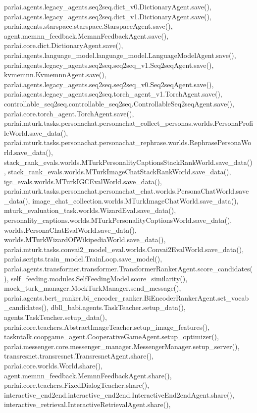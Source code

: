 parlai.\+agents.\+legacy\+\_\+agents.\+seq2seq.\+dict\+\_\+v0.\+Dictionary\+Agent.\+save(), parlai.\+agents.\+legacy\+\_\+agents.\+seq2seq.\+dict\+\_\+v1.\+Dictionary\+Agent.\+save(), parlai.\+agents.\+starspace.\+starspace.\+Starspace\+Agent.\+save(), agent.\+memnn\+\_\+feedback.\+Memnn\+Feedback\+Agent.\+save(), parlai.\+core.\+dict.\+Dictionary\+Agent.\+save(), parlai.\+agents.\+language\+\_\+model.\+language\+\_\+model.\+Language\+Model\+Agent.\+save(), parlai.\+agents.\+legacy\+\_\+agents.\+seq2seq.\+seq2seq\+\_\+v1.\+Seq2seq\+Agent.\+save(), kvmemnn.\+Kvmemnn\+Agent.\+save(), parlai.\+agents.\+legacy\+\_\+agents.\+seq2seq.\+seq2seq\+\_\+v0.\+Seq2seq\+Agent.\+save(), parlai.\+agents.\+legacy\+\_\+agents.\+seq2seq.\+torch\+\_\+agent\+\_\+v1.\+Torch\+Agent.\+save(), controllable\+\_\+seq2seq.\+controllable\+\_\+seq2seq.\+Controllable\+Seq2seq\+Agent.\+save(), parlai.\+core.\+torch\+\_\+agent.\+Torch\+Agent.\+save(), parlai.\+mturk.\+tasks.\+personachat.\+personachat\+\_\+collect\+\_\+personas.\+worlds.\+Persona\+Profile\+World.\+save\+\_\+data(), parlai.\+mturk.\+tasks.\+personachat.\+personachat\+\_\+rephrase.\+worlds.\+Rephrase\+Persona\+World.\+save\+\_\+data(), stack\+\_\+rank\+\_\+evals.\+worlds.\+M\+Turk\+Personality\+Captions\+Stack\+Rank\+World.\+save\+\_\+data(), stack\+\_\+rank\+\_\+evals.\+worlds.\+M\+Turk\+Image\+Chat\+Stack\+Rank\+World.\+save\+\_\+data(), igc\+\_\+evals.\+worlds.\+M\+Turk\+I\+G\+C\+Eval\+World.\+save\+\_\+data(), parlai.\+mturk.\+tasks.\+personachat.\+personachat\+\_\+chat.\+worlds.\+Persona\+Chat\+World.\+save\+\_\+data(), image\+\_\+chat\+\_\+collection.\+worlds.\+M\+Turk\+Image\+Chat\+World.\+save\+\_\+data(), mturk\+\_\+evaluation\+\_\+task.\+worlds.\+Wizard\+Eval.\+save\+\_\+data(), personality\+\_\+captions.\+worlds.\+M\+Turk\+Personality\+Captions\+World.\+save\+\_\+data(), worlds.\+Persona\+Chat\+Eval\+World.\+save\+\_\+data(), worlds.\+M\+Turk\+Wizard\+Of\+Wikipedia\+World.\+save\+\_\+data(), parlai.\+mturk.\+tasks.\+convai2\+\_\+model\+\_\+eval.\+worlds.\+Convai2\+Eval\+World.\+save\+\_\+data(), parlai.\+scripts.\+train\+\_\+model.\+Train\+Loop.\+save\+\_\+model(), parlai.\+agents.\+transformer.\+transformer.\+Transformer\+Ranker\+Agent.\+score\+\_\+candidates(), self\+\_\+feeding.\+modules.\+Self\+Feeding\+Model.\+score\+\_\+similarity(), mock\+\_\+turk\+\_\+manager.\+Mock\+Turk\+Manager.\+send\+\_\+message(), parlai.\+agents.\+bert\+\_\+ranker.\+bi\+\_\+encoder\+\_\+ranker.\+Bi\+Encoder\+Ranker\+Agent.\+set\+\_\+vocab\+\_\+candidates(), dbll\+\_\+babi.\+agents.\+Task\+Teacher.\+setup\+\_\+data(), agents.\+Task\+Teacher.\+setup\+\_\+data(), parlai.\+core.\+teachers.\+Abstract\+Image\+Teacher.\+setup\+\_\+image\+\_\+features(), taskntalk.\+coopgame\+\_\+agent.\+Cooperative\+Game\+Agent.\+setup\+\_\+optimizer(), parlai.\+messenger.\+core.\+messenger\+\_\+manager.\+Messenger\+Manager.\+setup\+\_\+server(), transresnet.\+transresnet.\+Transresnet\+Agent.\+share(), parlai.\+core.\+worlds.\+World.\+share(), agent.\+memnn\+\_\+feedback.\+Memnn\+Feedback\+Agent.\+share(), parlai.\+core.\+teachers.\+Fixed\+Dialog\+Teacher.\+share(), interactive\+\_\+end2end.\+interactive\+\_\+end2end.\+Interactive\+End2end\+Agent.\+share(), interactive\+\_\+retrieval.\+Interactive\+Retrieval\+Agent.\+share(), 